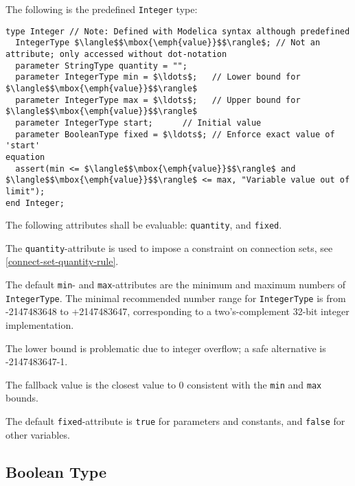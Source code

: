 The following is the predefined \lstinline!Integer! type:
\begin{lstlisting}[language=modelica]
type Integer // Note: Defined with Modelica syntax although predefined
  IntegerType $\langle$$\mbox{\emph{value}}$$\rangle$; // Not an attribute; only accessed without dot-notation
  parameter StringType quantity = "";
  parameter IntegerType min = $\ldots$;   // Lower bound for $\langle$$\mbox{\emph{value}}$$\rangle$
  parameter IntegerType max = $\ldots$;   // Upper bound for $\langle$$\mbox{\emph{value}}$$\rangle$
  parameter IntegerType start;      // Initial value
  parameter BooleanType fixed = $\ldots$; // Enforce exact value of 'start'
equation
  assert(min <= $\langle$$\mbox{\emph{value}}$$\rangle$ and $\langle$$\mbox{\emph{value}}$$\rangle$ <= max, "Variable value out of limit");
end Integer;
\end{lstlisting}%
%
%
%
%

The following attributes shall be evaluable: \lstinline!quantity!, and \lstinline!fixed!.

The \lstinline!quantity!-attribute is used to impose a constraint on connection sets, see \cref{connect-set-quantity-rule}.

The default \lstinline!min!- and \lstinline!max!-attributes are the minimum and maximum numbers of \lstinline!IntegerType!.
The minimal recommended number range for \lstinline!IntegerType! is from -2147483648 to +2147483647, corresponding to a two's-complement 32-bit integer implementation.

\begin{nonnormative}
The lower bound is problematic due to integer overflow; a safe alternative is -2147483647-1.
\end{nonnormative}

The fallback value is the closest value to $0$ consistent with the \lstinline!min! and \lstinline!max! bounds.

The default \lstinline!fixed!-attribute is \lstinline!true! for parameters and constants, and \lstinline!false! for other variables.

\subsection{Boolean Type}\label{boolean-type}

